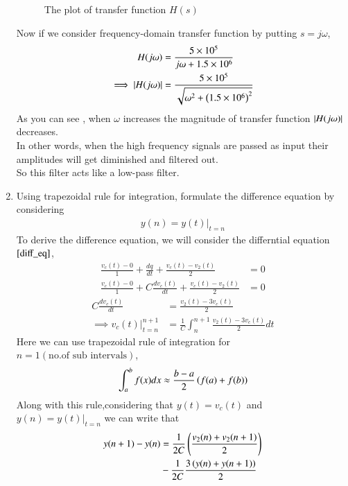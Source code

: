 \documentclass[journal,12pt,twocolumn]{IEEEtran}
\renewcommand\thesection{\arabic{section}}
\begin{document}
\begin{enumerate}[label=\arabic*.,ref=\thesection.\theenumi]
\begin{figure}
	    \caption{The plot of transfer function $H(s)$}
	    \label{fig:H(s)}
	  \end{figure}
Now if we consider frequency-domain transfer function by putting $s = j\omega$,
  \begin{align}
	  H(j\omega) &=\frac{5 \times 10^5}{j\omega + 1.5 \times 10^6} \\
	  \implies \left\vert H(j\omega)\right\vert &=\frac{5 \times 10^5}{\sqrt{\omega^2 + \left(1.5 \times 10^6\right)^2}}
  \end{align}
     As you can see , when $\omega$ increases the magnitude of transfer function $\left\vert H(j\omega)\right\vert$ decreases.\\
     In other words, when the high frequency signals are passed as input their amplitudes will get diminished and filtered out. \\
     So this filter acts like a low-pass filter.
   \item Using trapezoidal rule for integration, formulate the difference equation
			by considering 
		\begin{align}
			y(n) = y(t)\vert_{t=n}
		\end{align}
		\solution To derive the difference equation, we will consider the differntial equation $\eqref{diff_eq}$,
    \begin{align}
	    \frac{v_{c}(t) - 0}{1} +  \frac{dq}{dt} + \frac{v_c(t) - v_2(t)}{2} &= 0 \\
	    \frac{v_{c}(t) -0}{1} + C\frac{dv_{c}(t)}{dt} + \frac{v_c(t) - v_2(t)}{2} &= 0
    \end{align}
    \begin{align}
	    C\frac{dv_{c}(t)}{dt} &= \frac{v_2(t) - 3v_c(t)}{2}\\
	    \implies v_{c}(t)\vert_{t = n}^{n+1} &= \frac{1}{C}\int_{n}^{n+1}\frac{v_2(t) - 3v_c(t)}{2} dt
    \end{align}
    Here we can use trapezoidal rule of integration for $n = 1 (\text{no.of sub intervals})$,
     \begin{align}
	     \int_{a}^{b}f(x)dx \approx \frac{b-a}{2}\left(f(a) + f(b)\right)
     \end{align}
     Along with this rule,considering that $y(t) = v_c(t)$ and $y(n) = y(t)\vert_{t=n}$ we can write that
      \begin{align}
           y(n+1) - y(n) &= \frac{1}{2C}\left(\frac{v_2(n) + v_2(n+1)}{2}\right) \nonumber \\
                    &- \frac{1}{2C}\frac{3\left(y(n) + y(n+1)\right)}{2}
      \end{align}

\end{enumerate}
\end{document}
